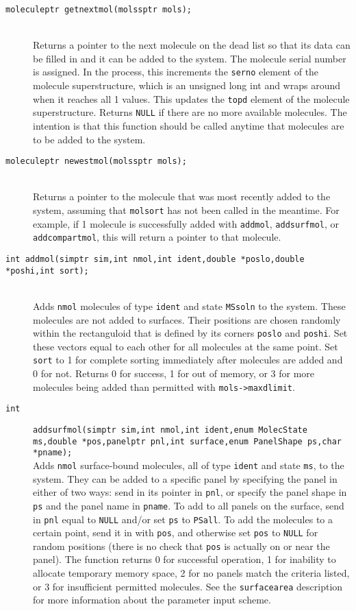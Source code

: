 \documentclass {book}
\newcommand {\ttt} {\texttt}
\begin{document}
\begin{description}
\item[\ttt{moleculeptr getnextmol(molssptr mols);}]
\hfill \\
Returns a pointer to the next molecule on the dead list so that its data can be filled in and it can be added to the system. The molecule serial number is assigned. In the process, this increments the \ttt{serno} element of the molecule superstructure, which is an unsigned long int and wraps around when it reaches all 1 values. This updates the \ttt{topd} element of the molecule superstructure. Returns \ttt{NULL} if there are no more available molecules. The intention is that this function should be called anytime that molecules are to be added to the system.

\item[\ttt{moleculeptr newestmol(molssptr mols);}]
\hfill \\
Returns a pointer to the molecule that was most recently added to the system, assuming that \ttt{molsort} has not been called in the meantime. For example, if 1 molecule is successfully added with \ttt{addmol}, \ttt{addsurfmol}, or \ttt{addcompartmol}, this will return a pointer to that molecule.

\item[\ttt{int addmol(simptr sim,int nmol,int ident,double *poslo,double *poshi,int sort);}]
\hfill \\
Adds \ttt{nmol} molecules of type \ttt{ident} and state \ttt{MSsoln} to the system. These molecules are not added to surfaces. Their positions are chosen randomly within the rectanguloid that is defined by its corners \ttt{poslo} and \ttt{poshi}. Set these vectors equal to each other for all molecules at the same point. Set \ttt{sort} to 1 for complete sorting immediately after molecules are added and 0 for not. Returns 0 for success, 1 for out of memory, or 3 for more molecules being added than permitted with \ttt{mols->maxdlimit}.

\item[\ttt{int}]
\ttt{addsurfmol(simptr sim,int nmol,int ident,enum MolecState ms,double *pos,panelptr pnl,int surface,enum PanelShape ps,char *pname);} \\
Adds \ttt{nmol} surface-bound molecules, all of type \ttt{ident} and state \ttt{ms}, to the system. They can be added to a specific panel by specifying the panel in either of two ways: send in its pointer in \ttt{pnl}, or specify the panel shape in \ttt{ps} and the panel name in \ttt{pname}. To add to all panels on the surface, send in \ttt{pnl} equal to \ttt{NULL} and/or set \ttt{ps} to \ttt{PSall}. To add the molecules to a certain point, send it in with \ttt{pos}, and otherwise set \ttt{pos} to \ttt{NULL} for random positions (there is no check that \ttt{pos} is actually on or near the panel). The function returns 0 for successful operation, 1 for inability to allocate temporary memory space, 2 for no panels match the criteria listed, or 3 for insufficient permitted molecules. See the \ttt{surfacearea} description for more information about the parameter input scheme.


\end{description}
\end{document}
